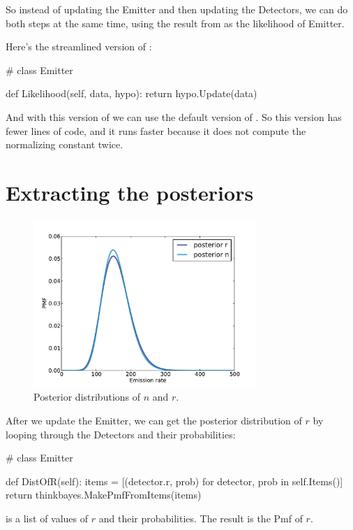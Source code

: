 \documentclass[12pt]{book}
\theoremstyle{exercise}
\begin{document}
So instead of updating the Emitter and then updating the
Detectors, we can do both steps at the same time, using
the result from  as the likelihood
of Emitter.

Here's the streamlined version of :

\begin{code}
# class Emitter

    def Likelihood(self, data, hypo):
        return hypo.Update(data)
\end{code}

And with this version of  we can use the
default version of .  So this version has fewer
lines of code, and it runs faster because it does not compute
the normalizing constant twice.


\section{Extracting the posteriors}

\begin{figure}
\centerline{\includegraphics[height=2.5in]{figs/jaynes2.pdf}}
\caption{Posterior distributions of $n$ and $r$.}
\label{fig.jaynes2}
\end{figure}

After we update the Emitter, we can get the posterior distribution
of $r$ by looping through the Detectors and their probabilities:

\begin{code}
# class Emitter

    def DistOfR(self):
        items = [(detector.r, prob) for detector, prob in self.Items()]
        return thinkbayes.MakePmfFromItems(items)
\end{code}

 is a list of values of $r$ and their probabilities.
The result is the Pmf of $r$.
\end{document}
